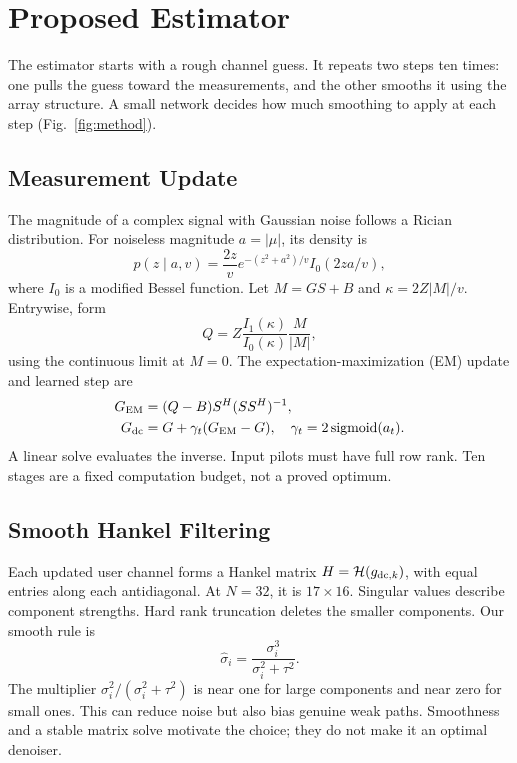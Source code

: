 \documentclass[journal]{IEEEtran}
\newcommand{\Hank}{\mathcal{H}}
\DeclareMathOperator{\sigmoid}{sigmoid}
\begin{document}
\section{Proposed Estimator}
The estimator starts with a rough channel guess. It repeats two steps ten
times: one pulls the guess toward the measurements, and the other smooths
it using the array structure. A small network decides how much smoothing
to apply at each step (Fig.~\ref{fig:method}).

\subsection{Measurement Update}
The magnitude of a complex signal with Gaussian noise follows a Rician
distribution. For noiseless magnitude $a=|\mu|$, its density is
\begin{equation}
 p(z\mid a,v)=\frac{2z}{v}e^{-(z^2+a^2)/v}I_0(2za/v),
\end{equation}
where $I_0$ is a modified Bessel function. Let $M=GS+B$ and
$\kappa=2Z|M|/v$. Entrywise, form
\begin{equation}
 Q=Z\frac{I_1(\kappa)}{I_0(\kappa)}\frac{M}{|M|},
\end{equation}
using the continuous limit at $M=0$. The expectation-maximization (EM)
update and learned step are
\begin{align}
 G_{\rm EM}&=(Q-B)S^H(SS^H)^{-1},\\
 G_{\rm dc}&=G+\gamma_t(G_{\rm EM}-G),\quad
 \gamma_t=2\sigmoid(a_t).
\end{align}
A linear solve evaluates the inverse. Input pilots must have full row
rank. Ten stages are a fixed computation budget, not a proved optimum.

\subsection{Smooth Hankel Filtering}
Each updated user channel forms a Hankel matrix $H=\Hank(g_{{\rm dc},k})$,
with equal entries along each antidiagonal. At $N=32$, it is $17\times16$.
Singular values describe component strengths. Hard rank truncation deletes
the smaller components. Our smooth rule is
\begin{equation}
 \widehat\sigma_i=\frac{\sigma_i^3}{\sigma_i^2+\tau^2}.
\end{equation}
The multiplier $\sigma_i^2/(\sigma_i^2+\tau^2)$ is near one for large
components and near zero for small ones. This can reduce noise but also
bias genuine weak paths. Smoothness and a stable matrix solve motivate
the choice; they do not make it an optimal denoiser.
\end{document}
